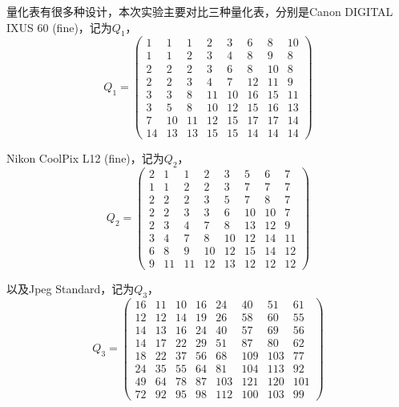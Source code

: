 \documentclass[12pt,a4paper]{article}
\begin{document}
量化表有很多种设计，本次实验主要对比三种量化表，分别是Canon DIGITAL IXUS 60 (fine)，记为$Q_1$，
\begin{equation}
    Q_1 = \left(\begin{matrix}
        1 & 1 & 1 & 2 & 3 & 6 & 8 & 10 \\
        1 & 1 & 2 & 3 & 4 & 8 & 9 & 8 \\
        2 & 2 & 2 & 3 & 6 & 8 & 10 & 8 \\
        2 & 2 & 3 & 4 & 7 & 12 & 11 & 9 \\
        3 & 3 & 8 & 11 & 10 & 16 & 15 & 11 \\
        3 & 5 & 8 & 10 & 12 & 15 & 16 & 13 \\
        7 & 10 & 11 & 12 & 15 & 17 & 17 & 14 \\
        14 & 13 & 13 & 15 & 15 & 14 & 14 & 14
    \end{matrix}\right)
\end{equation}

Nikon CoolPix L12 (fine)，记为$Q_2$，
\begin{equation}
    Q_2 = \left(\begin{matrix}
        2 & 1 & 1 & 2 & 3 & 5 & 6 & 7 \\
        1 & 1 & 2 & 2 & 3 & 7 & 7 & 7 \\
        2 & 2 & 2 & 3 & 5 & 7 & 8 & 7 \\
        2 & 2 & 3 & 3 & 6 & 10 & 10 & 7 \\
        2 & 3 & 4 & 7 & 8 & 13 & 12 & 9 \\
        3 & 4 & 7 & 8 & 10 & 12 & 14 & 11 \\
        6 & 8 & 9 & 10 & 12 & 15 & 14 & 12 \\
        9 & 11 & 11 & 12 & 13 & 12 & 12 & 12
    \end{matrix}\right)
\end{equation}

以及Jpeg Standard，记为$Q_3$，
\begin{equation}
    Q_3 = \left(\begin{matrix}
        16 & 11 & 10 & 16 & 24 & 40 & 51 & 61 \\
        12 & 12 & 14 & 19 & 26 & 58 & 60 & 55 \\
        14 & 13 & 16 & 24 & 40 & 57 & 69 & 56 \\
        14 & 17 & 22 & 29 & 51 & 87 & 80 & 62 \\
        18 & 22 & 37 & 56 & 68 & 109 & 103 & 77 \\
        24 & 35 & 55 & 64 & 81 & 104 & 113 & 92 \\
        49 & 64 & 78 & 87 & 103 & 121 & 120 & 101 \\
        72 & 92 & 95 & 98 & 112 & 100 & 103 & 99
    \end{matrix}\right)
\end{equation}
\end{document}
